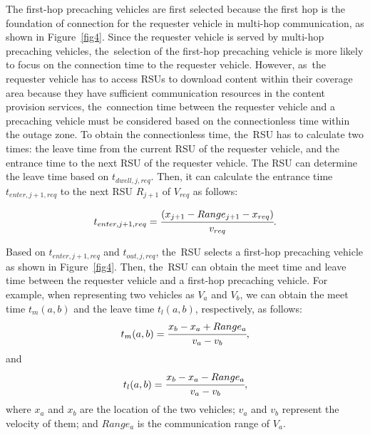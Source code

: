 \documentclass[electronics,aricle,accept,pdftex,moreauthors]{Definitions/mdpi}
\begin{document}
The first-hop precaching vehicles are first selected because the first hop is the foundation of connection for the requester vehicle in multi-hop communication, as shown in Figure~\ref{fig4}.
Since the requester vehicle is served by multi-hop precaching vehicles, the~selection of the first-hop precaching vehicle is more likely to focus on the connection time to the requester vehicle.
However, as~the requester vehicle has to access RSUs to download content within their coverage area because they have sufficient communication resources in the content provision services, the~connection time between the requester vehicle and a precaching vehicle must be considered based on the connectionless time within the outage zone.
To obtain the connectionless time, the~RSU has to calculate two times: the leave time from the current RSU of the requester vehicle, and the entrance time to the next RSU of the requester vehicle.
The RSU can determine the leave time based on $t_{dwell,j,req}$.
Then, it can calculate the entrance time $t_{enter,j+1,req}$ to the next RSU $R_{j+1}$ of $V_{req}$ as follows:







\begin{equation}
    t_{enter,j+1,req} = \cfrac{(x_{j+1} - Range_{j+1} - x_{req})}{v_{req}}.
\end{equation}

Based on $t_{enter,j+1,req}$ and $t_{out, j,req}$, the~RSU selects a first-hop precaching vehicle as shown in Figure~\ref{fig4}.
Then, the~RSU can obtain the meet time and leave time between the requester vehicle and a first-hop precaching vehicle.
For example, when representing two vehicles as $V_{a}$ and $V_{b}$, we can obtain the meet time $t_{m}(a,b)$ and the leave time $t_{l}(a,b)$, respectively, as follows:
\begin{equation}
    t_{m}(a,b)=\cfrac{x_{b}-x_{a}+Range_{a}}{v_{a}-v_{b}},
\end{equation}
and
\begin{equation}
    t_{l}(a,b)=\cfrac{x_{b}-x_{a}-Range_{a}}{v_{a}-v_{b}},
\end{equation}
where $x_{a}$ and $x_{b}$ are the location of the two vehicles; $v_{a}$ and $v_{b}$ represent the velocity of them; and $Range_{a}$ is the communication range of $V_{a}$.
\end{document}
